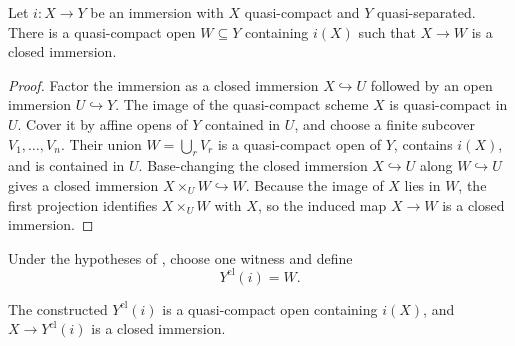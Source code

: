 \begin{lemma}
  \label{lemma:nagata-immersion-shrink-to-closed-exists}

  Let $i\colon X\to Y$ be an immersion with $X$ quasi-compact and $Y$
  quasi-separated.  There is a quasi-compact open $W\subseteq Y$ containing
  $i(X)$ such that $X\to W$ is a closed immersion.
\end{lemma}

\begin{proof}
  Factor the immersion as a closed immersion $X\hookrightarrow U$ followed by
  an open immersion $U\hookrightarrow Y$.  The image of the quasi-compact
  scheme $X$ is quasi-compact in $U$.  Cover it by affine opens of $Y$
  contained in $U$, and choose a finite subcover $V_1,\ldots,V_n$.  Their
  union $W=\bigcup_rV_r$ is a quasi-compact open of $Y$, contains $i(X)$,
  and is contained in $U$.  Base-changing the closed immersion
  $X\hookrightarrow U$ along $W\hookrightarrow U$ gives a closed immersion
  $X\times_UW\hookrightarrow W$.  Because the image of $X$ lies in $W$, the
  first projection identifies $X\times_UW$ with $X$, so the induced map
  $X\to W$ is a closed immersion.
\end{proof}

\begin{definition}
  \label{def:nagata-immersion-shrink-to-closed}

  Under the hypotheses of
  , choose one witness and
  define
  \[
    Y^{\mathrm{cl}}(i)=W.
  \]
\end{definition}

\begin{lemma}
  \label{lemma:nagata-immersion-shrink-to-closed}

  The constructed $Y^{\mathrm{cl}}(i)$ is a quasi-compact open containing
  $i(X)$, and $X\to Y^{\mathrm{cl}}(i)$ is a closed immersion.
\end{lemma}

